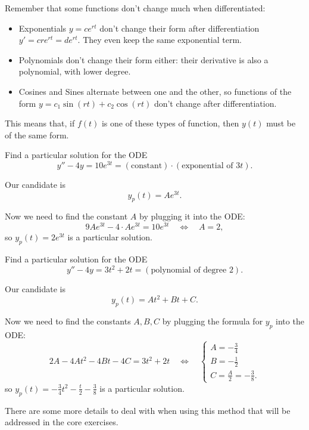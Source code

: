 Remember that some functions don't change much when differentiated:
\begin{itemize}
	\item Exponentials $y=ce^{rt}$ don't change their form after differentiation $y'=cre^{rt} = de^{rt}$. They even keep the same exponential term.
	\item Polynomials don't change their form either: their derivative is also a polynomial, with lower degree.
	\item Cosines and Sines alternate between one and the other, so functions of the form $y=c_1 \sin(rt) + c_2\cos(rt)$ don't change after differentiation.
\end{itemize}

This means that, if $f(t)$ is one of these types of function, then $y(t)$ must be of the same form.	


\begin{example}
Find a particular solution for the ODE
$$
y''  - 4y = 10 e^{3t} = (\text{constant}) \cdot (\text{exponential of } 3t).
$$	

Our candidate is
$$
y_p(t) = A e^{3t}.
$$

Now we need to find the constant $A$ by plugging it into the ODE:
$$
9 A e^{3t} - 4 \cdot A e^{3t} = 10 e^{3t}
\quad \Leftrightarrow \quad 
	A = 2,
$$
so $y_p(t) = 2 e^{3t}$ is a particular solution.
\end{example}


\begin{example}
Find a particular solution for the ODE
$$
y''  - 4y = 3t^2+2t = (\text{polynomial of degree 2}).
$$	

Our candidate is
$$
y_p(t) = At^2 + Bt + C.
$$

Now we need to find the constants $A, B, C$ by plugging the formula for $y_p$ into the ODE:
$$
2A - 4At^2 - 4B t - 4C = 3t^2+2t
\quad \Leftrightarrow \quad 
\begin{cases}
A = -\frac34 \\
B = -\frac12 \\
C = \frac{A}{2} = -\frac38.	
\end{cases}
$$
so $y_p(t) = -\frac34 t^2 - \frac{t}{2} - \frac38$ is a particular solution.
\end{example}

There are some more details to deal with when using this method that will be addressed in the core exercises.


